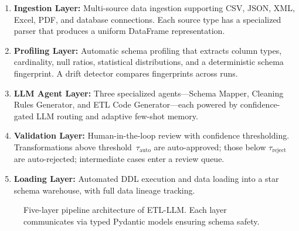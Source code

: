 \documentclass[conference]{IEEEtran}
\begin{document}
\begin{enumerate}
  \item \textbf{Ingestion Layer:} Multi-source data ingestion supporting CSV,
    JSON, XML, Excel, PDF, and database connections. Each source type has a
    specialized parser that produces a uniform DataFrame representation.
  \item \textbf{Profiling Layer:} Automatic schema profiling that extracts
    column types, cardinality, null ratios, statistical distributions, and a
    deterministic schema fingerprint. A drift detector compares fingerprints
    across runs.
  \item \textbf{LLM Agent Layer:} Three specialized agents---Schema Mapper,
    Cleaning Rules Generator, and ETL Code Generator---each powered by
    confidence-gated LLM routing and adaptive few-shot memory.
  \item \textbf{Validation Layer:} Human-in-the-loop review with confidence
    thresholding. Transformations above threshold~$\tau_{\text{auto}}$ are
    auto-approved; those below $\tau_{\text{reject}}$ are auto-rejected;
    intermediate cases enter a review queue.
  \item \textbf{Loading Layer:} Automated DDL execution and data loading into a
    star schema warehouse, with full data lineage tracking.
\end{enumerate}

\begin{figure}[t]
  \centering
  \caption{Five-layer pipeline architecture of \textsc{ETL-LLM}. Each layer
  communicates via typed Pydantic models ensuring schema safety.}
  \label{fig:architecture}
\end{figure}

\end{document}
